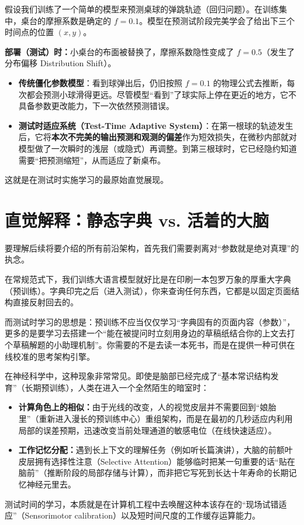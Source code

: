\begin{toybox}[title=玩具问题 A：预测弹跳路径分布的偏移]
假设我们训练了一个简单的模型来预测桌球的弹跳轨迹（回归问题）。在训练集中，桌台的摩擦系数是确定的 $f=0.1$。模型在预测试阶段完美学会了给出下三个时间点的位置 $(x,y)$。

\textbf{部署（测试）时：}小桌台的布面被替换了，摩擦系数隐性变成了 $f=0.5$（发生了分布偏移 Distribution Shift）。
\begin{itemize}
    \item \textbf{传统僵化参数模型}：看到球弹出后，仍旧按照 $f=0.1$ 的物理公式去推断，每次都会预测小球滑得更远。尽管模型“看到”了球实际上停在更近的地方，它不具备参数更改能力，下一次依然预测错误。
    \item \textbf{测试时适应系统（Test-Time Adaptive System）}：在第一根球的轨迹发生后，它将\textbf{本次不完美的输出预测和观测的偏差}作为短效损失，在微秒内部就对模型做了一次瞬时的浅层（或隐式）再调整。到第三根球时，它已经隐约知道需要“把预测缩短”，从而适应了新桌布。
\end{itemize}
这就是在测试时实施学习的最原始直觉展现。
\end{toybox}

\section{直觉解释：静态字典 vs. 活着的大脑}
\label{sec:intro_intuition}

要理解后续将要介绍的所有前沿架构，首先我们需要剥离对“参数就是绝对真理”的执念。

在常规范式下，我们训练大语言模型就好比是在印刷一本包罗万象的厚重大字典（预训练）。字典印完之后（进入测试），你来查询任何东西，它都是以固定页面结构直接反射回去的。

而测试时学习的思想是：预训练不应当仅仅学习“字典固有的页面内容（参数）”，更多的是要学习去搭建一个“能在被提问时立刻用身边的草稿纸结合你的上文去打个草稿解题的小助理机制”。你需要的不是去读一本死书，而是在提供一种可供在线校准的思考架构引擎。

\begin{neurosciencebox}[title=神经科学直觉：选择性注意与快速适应]
在神经科学中，这种现象非常常见。即使是脑部已经完成了“基本常识结构发育”（长期预训练），人类在进入一个全然陌生的暗室时：
\begin{itemize}
    \item \textbf{计算角色上的相似：}由于光线的改变，人的视觉皮层并不需要回到“娘胎里”（重新进入漫长的预训练中心）重组架构，而是在最初的几秒适应内利用局部的误差预期，迅速改变当前处理通道的敏感电位（在线快速适应）。
    \item \textbf{工作记忆分配：}遇到长上下文的理解任务（例如听长篇演讲），大脑的前额叶皮层拥有选择性注意（Selective Attention）能够临时把某一句重要的话“贴在脑前”（推断阶段的局部存储与计算），而非把它写死到长达十年寿命的长期记忆神经元里去。
\end{itemize}
测试时间的学习，本质就是在计算机工程中去唤醒这种本该存在的“现场试错适应”（Sensorimotor calibration）以及短时间尺度的工作缓存运算能力。
\end{neurosciencebox}

